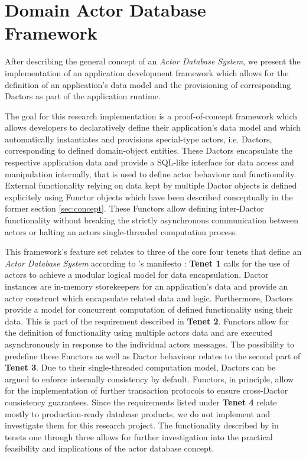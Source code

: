 
\section{Domain Actor Database Framework}\label{sec:framework}

After describing the general concept of an \textit{Actor Database System}, we present the implementation of an application development framework which allows for the definition of an application's data model and the provisioning of corresponding Dactors as part of the application runtime.

The goal for this research implementation is a proof-of-concept framework which allows developers to declaratively define their application's data model
and which automatically instantiates and provisions special-type actors, i.e. Dactors, corresponding to defined domain-object entities.
These Dactors encapsulate the respective application data and provide a SQL-like interface for data access and manipulation internally, that is used to define actor behaviour and functionality.
External functionality relying on data kept by multiple Dactor objects is defined explicitely using Functor objects which have been described conceptually in the former section \ref{sec:concept}.
These Functors allow defining inter-Dactor functionality without breaking the strictly asynchronous communication between actors or halting an actors single-threaded computation process.

This framework's feature set relates to three of the core four tenets that define an \textit{Actor Database System} according to \citeauthor{manifesto}'s manifesto \cite{manifesto}:
\textbf{Tenet 1} calls for the use of actors to achieve a modular logical model for data encapsulation.
Dactor instances are in-memory storekeepers for an application's data and provide an actor construct which encapsulate related data and logic.
Furthermore, Dactors provide a model for concurrent computation of defined functionality using their data.
This is part of the requirement described in \textbf{Tenet 2}.
Functors allow for the definition of functionality using multiple actors data and are executed asynchronously in response to the individual actors messages.
The possibility to predefine these Functors as well as Dactor behaviour relates to the second part of \textbf{Tenet 3}.
Due to their single-threaded computation model, Dactors can be argued to enforce internally consistency by default.
Functors, in principle, allow for the implementation of further transaction protocols to ensure cross-Dactor consistency guarantees.
Since the requirements listed under \textbf{Tenet 4} relate mostly to production-ready database products, we do not implement and investigate them for this research project.
The functionality described by \citeauthor{manifesto} in tenets one through three allows for further investigation into the practical feasibility and implications of the actor database concept.

